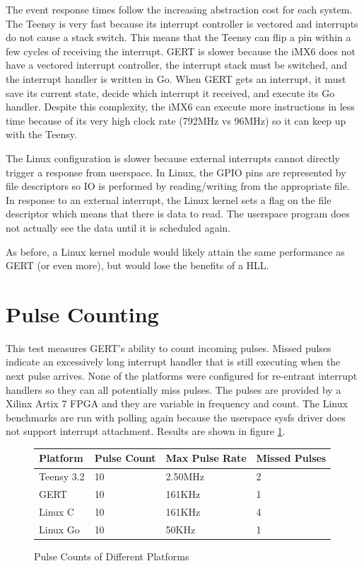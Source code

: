The event response times follow the increasing abstraction cost for each system.
The Teensy is very fast because its interrupt controller is vectored and interrupts
do not cause a stack switch. This means that the Teensy can flip a pin within a few cycles
of receiving the interrupt. GERT is slower because the iMX6 does not have a
vectored interrupt controller, the interrupt stack must be switched, and the
interrupt handler is written in Go. When GERT gets an interrupt, it must save its
current state, decide which interrupt it received, and execute its Go handler. Despite this
complexity, the iMX6 can execute more instructions in less time because of its very
high clock rate (792MHz vs 96MHz) so it can keep up with the Teensy.

The Linux configuration is slower because external interrupts cannot directly trigger a response
from userspace. In Linux, the GPIO pins are represented by file descriptors so
IO is performed by reading/writing from the appropriate file. In response to an external interrupt,
the Linux kernel sets a flag on the file descriptor which means that there is data to read. The userspace
program does not actually see the data until it is scheduled again.

As before, a Linux kernel module would likely attain the same performance as GERT
(or even more), but would lose the benefits of a HLL.


\section{Pulse Counting}\label{sec:pulse_count}
This test measures GERT's ability to count incoming pulses. Missed pulses
indicate an excessively long interrupt handler that is still executing when the next
pulse arrives. None of the platforms were configured for re-entrant interrupt handlers
so they can all potentially miss pulses.
The pulses are provided by a Xilinx Artix 7 FPGA and they are variable in
frequency and count. The Linux benchmarks are run with polling again because the
userspace sysfs driver does not support interrupt attachment.
Results are shown in figure \ref{fig:counter}.


\begin{figure} [h]
\begin{center}
  \begin{tabular}{ | l | l | l | l |}
    \hline
    Platform & Pulse Count & Max Pulse Rate & Missed Pulses \\ \hline
    Teensy 3.2 & 10 & 2.50MHz & 2 \\ \hline
    GERT & 10 & 161KHz & 1 \\ \hline
    Linux C & 10 & 161KHz & 4 \\ \hline
    Linux Go & 10 & 50KHz & 1 \\
    \hline
  \end{tabular}
\end{center}
  \caption{Pulse Counts of Different Platforms}  \label{fig:counter}
\end{figure}

